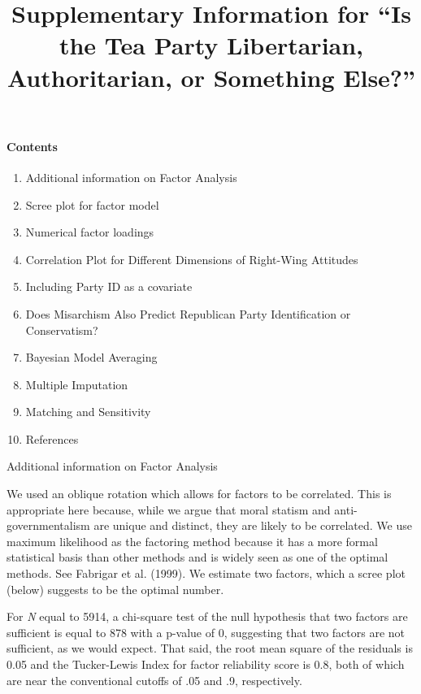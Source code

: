\documentclass[12pt,]{article}
\title{Supplementary Information for ``Is the Tea Party Libertarian, Authoritarian, or Something Else?''
\vspace{1.25em}}
\author{}
\date{}
\begin{document}
\maketitle

\paragraph{Contents}\label{contents}

\begin{enumerate}
\def\labelenumi{\arabic{enumi}.}
\itemsep1pt\parskip0pt
\item
Additional information on Factor Analysis
\item
  Scree plot for factor model
\item
  Numerical factor loadings
\item
Correlation Plot for Different Dimensions of Right-Wing Attitudes
\item
  Including Party ID as a covariate
\item
  Does Misarchism Also Predict Republican Party Identification or Conservatism?
\item
Bayesian Model Averaging
\item
Multiple Imputation
\item
Matching and Sensitivity
\item
References
\end{enumerate}

Additional information on Factor Analysis

We used an oblique rotation which allows for factors to be correlated. This is
  appropriate here because, while we argue that moral statism and
  anti-governmentalism are unique and distinct, they are likely to be
  correlated. We use maximum likelihood as the factoring method because
  it has a more formal statistical basis than other methods and is
  widely seen as one of the optimal methods. See Fabrigar et al. (1999). We estimate two factors, which a scree plot (below) suggests to be the optimal number.
  
For \emph{N} equal to 5914, a chi-square test of the null hypothesis that
  two factors are sufficient is equal to 878 with a p-value of 0,
  suggesting that two factors are not sufficient, as we would expect.
  That said, the root mean square of the residuals is 0.05 and the
  Tucker-Lewis Index for factor reliability score is 0.8, both of which
  are near the conventional cutoffs of .05 and .9, respectively.
\end{document}
